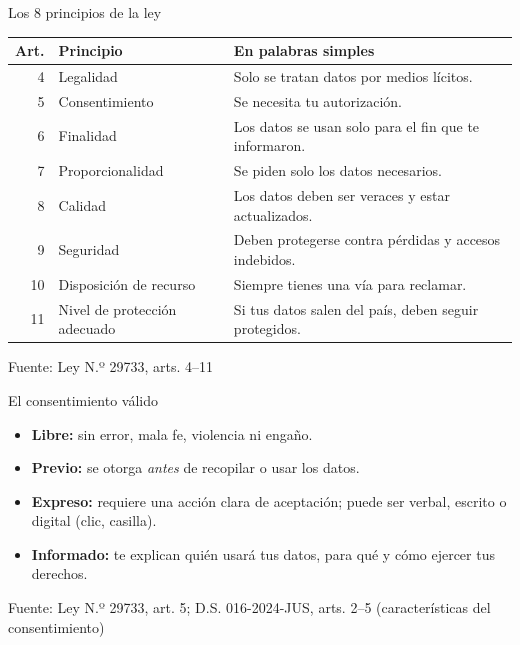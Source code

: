 \documentclass[aspectratio=169,11pt]{beamer}
\newcommand{\fuente}[1]{\par\vfill\hfill{\tiny\color{gray}Fuente: #1}}
\begin{document}
\begin{frame}{Los 8 principios de la ley}
\centering\small
\begin{tabular}{@{}rll@{}}
\toprule
Art. & Principio & En palabras simples \\
\midrule
4 & Legalidad & Solo se tratan datos por medios lícitos. \\
5 & \alert{Consentimiento} & Se necesita tu autorización. \\
6 & Finalidad & Los datos se usan solo para el fin que te informaron. \\
7 & Proporcionalidad & Se piden solo los datos necesarios. \\
8 & Calidad & Los datos deben ser veraces y estar actualizados. \\
9 & \alert{Seguridad} & Deben protegerse contra pérdidas y accesos indebidos. \\
10 & Disposición de recurso & Siempre tienes una vía para reclamar. \\
11 & Nivel de protección adecuado & Si tus datos salen del país, deben seguir protegidos. \\
\bottomrule
\end{tabular}
\fuente{Ley N.º 29733, arts. 4--11}
\end{frame}

\begin{frame}{El consentimiento válido}
\begin{center}
\end{center}
\begin{itemize}\small
  \item \textbf{Libre:} sin error, mala fe, violencia ni engaño.
  \item \textbf{Previo:} se otorga \emph{antes} de recopilar o usar los datos.
  \item \textbf{Expreso:} requiere una acción clara de aceptación; puede ser verbal, escrito o digital (clic, casilla).
  \item \textbf{Informado:} te explican quién usará tus datos, para qué y cómo ejercer tus derechos.
\end{itemize}
\fuente{Ley N.º 29733, art. 5; D.S. 016-2024-JUS, arts. 2--5 (características del consentimiento)}
\end{frame}
\end{document}
